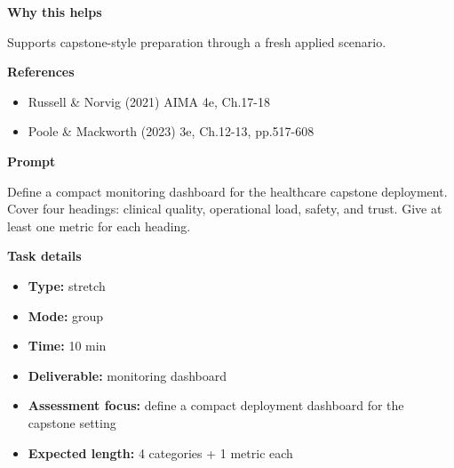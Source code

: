 \documentclass[11pt]{article}
\begin{document}
\begin{tcolorbox}[colback=white,colframe=MidnightBlue,title={Q5 Exam-Style Constructed Response},fonttitle=\bfseries,breakable]
{\large\bfseries\color{MidnightBlue} Why this helps}\par\medskip
Supports capstone-style preparation through a fresh applied scenario.

{\large\bfseries\color{MidnightBlue} References}\par\medskip
\begin{itemize}\item Russell \& Norvig (2021) AIMA 4e, Ch.17-18
\item Poole \& Mackworth (2023) 3e, Ch.12-13, pp.517-608\end{itemize}
\end{tcolorbox}

\begin{tcolorbox}[colback=white,colframe=MidnightBlue,title={Q6 Stretch Extension},fonttitle=\bfseries,breakable]
\begin{center}
\end{center}

{\large\bfseries\color{MidnightBlue} Prompt}\par\medskip
Define a compact monitoring dashboard for the healthcare capstone deployment. Cover four headings: clinical quality, operational load, safety, and trust. Give at least one metric for each heading.

{\large\bfseries\color{MidnightBlue} Task details}\par\medskip
\begin{itemize}\item \textbf{Type:} stretch
\item \textbf{Mode:} group
\item \textbf{Time:} 10 min
\item \textbf{Deliverable:} monitoring dashboard
\item \textbf{Assessment focus:} define a compact deployment dashboard for the capstone setting
\item \textbf{Expected length:} 4 categories + 1 metric each\end{itemize}


\end{tcolorbox}
\end{document}
